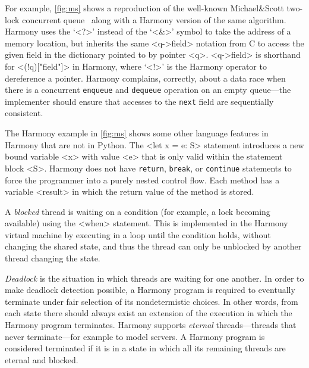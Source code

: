 \documentclass[twocolumn]{article}
\begin{document}
For example, \autoref{fig:ms} shows a reproduction of the well-known
Michael\&Scott two-lock concurrent queue~\cite{MS96} along with a
Harmony version of the same algorithm.
Harmony uses the `<{?}>' instead of the `<{&}>' symbol to take the address
of a memory location, but inherits the same <{q->field}> notation
from C to access the given field in the dictionary pointed to by
pointer <{q}>.  <{q->field}> is shorthand for <{(!q)["field"]}> in
Harmony, where `<{!}>' is the Harmony operator to dereference a pointer.
Harmony complains, correctly, about a data race when
there is a concurrent \texttt{enqueue} and \texttt{dequeue} operation
on an empty queue---the implementer should ensure that accesses to the
\texttt{next} field are sequentially consistent.

The Harmony example in \autoref{fig:ms} shows some other language
features in Harmony that are not in Python.
The <{let x = e: S}> statement introduces a new bound variable <{x}>
with value <{e}> that is only valid within the statement block <{S}>.
Harmony does not have \texttt{return}, \texttt{break}, or
\texttt{continue} statements to force the programmer into a purely
nested control flow.  Each method has a variable <{result}> in which
the return value of the method is stored.

A \emph{blocked} thread is waiting on a condition
(for example, a lock becoming available) using the <{when}> statement.
This is implemented in the Harmony virtual machine
by executing in a loop until the condition holds, without changing the
shared state, and thus the thread can only be unblocked by another thread
changing the state.

\emph{Deadlock} is the situation in which threads are waiting for
one another.
In order to make deadlock detection possible, a Harmony program is
required to eventually terminate under fair selection of its
nondetermistic choices.  In other words, from each state there
should always exist an extension of the execution in which the
Harmony program terminates.  Harmony supports \emph{eternal}
threads---threads that never terminate---for example to model
servers.  A Harmony program is considered terminated if it is in a
state in which all its remaining threads are eternal and blocked.
\end{document}
